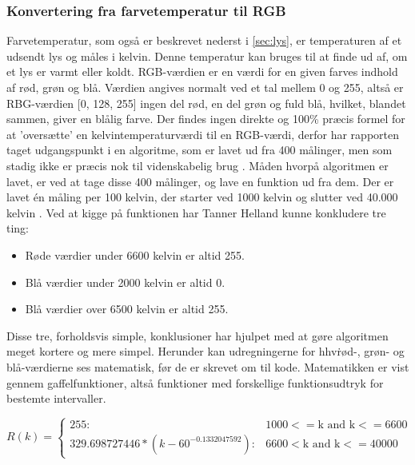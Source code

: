 \subsubsection{Konvertering fra farvetemperatur til RGB}
\label{sec:temptilrgb}
Farvetemperatur, som også er beskrevet nederst i \ref{sec:lys}, er temperaturen af et udsendt lys og måles i kelvin. Denne temperatur kan bruges til at finde ud af, om et lys er varmt eller koldt. 
RGB-værdien er en værdi for en given farves indhold af rød, grøn og blå. Værdien angives normalt ved et tal mellem 0 og 255, altså er RBG-værdien [0, 128, 255] ingen del rød, en del grøn og fuld blå, hvilket, blandet sammen, giver en blålig farve.
Der findes ingen direkte og 100\% præcis formel for at ’oversætte’ en kelvintemperaturværdi til en RGB-værdi, derfor har rapporten taget udgangspunkt i en algoritme, som er lavet ud fra 400 målinger, men som stadig ikke er præcis nok til videnskabelig brug \cite{tanner_helland}.
Måden hvorpå algoritmen er lavet, er ved at tage disse 400 målinger, og lave en funktion ud fra dem. Der er lavet én måling per 100 kelvin, der starter ved 1000 kelvin og slutter ved 40.000 kelvin \cite{charity_values}. Ved at kigge på funktionen \cite{tanner_helland_chart} har Tanner Helland kunne konkludere  tre ting:

\begin{itemize}
\item Røde værdier under 6600 kelvin er altid 255.
\item Blå værdier under 2000 kelvin er altid 0.
\item Blå værdier over 6500 kelvin er altid 255.
\end{itemize}

Disse tre, forholdsvis simple, konklusioner har hjulpet med at gøre algoritmen meget kortere og mere simpel. Herunder kan udregningerne for hhv\.  rød-, grøn- og blå-værdierne ses matematisk, før de er skrevet om til kode. Matematikken er vist gennem gaffelfunktioner, altså funktioner med forskellige funktionsudtryk for bestemte intervaller.


\begin{displaymath}
   R(k) = \left\{
     \begin{array}{lr}
       255: & 1000 <= \text{k and k} <= 6600\\
       329.698727446*(k-60^{-0.1332047592}): & 6600< \text{k and k} <= 40000
     \end{array}
   \right.
\end{displaymath} 

